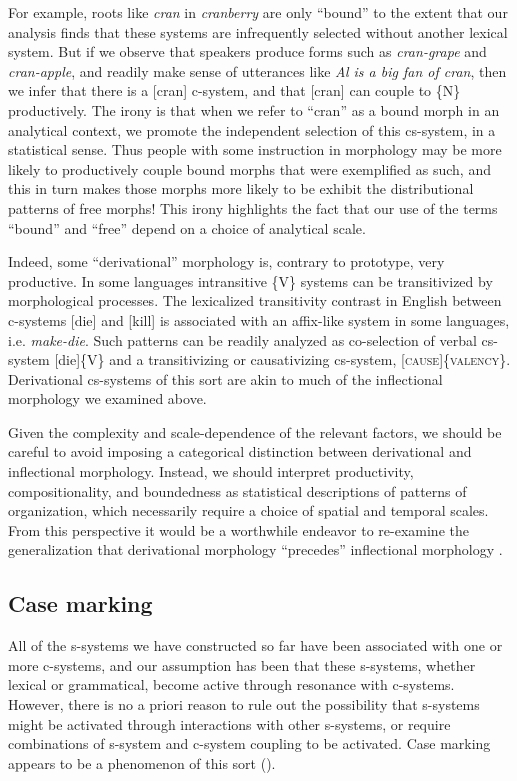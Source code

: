   For example, roots like \textit{cran} in \textit{cranberry} are only “bound” to the extent that our analysis finds that these systems are infrequently selected without another lexical system. But if we observe that speakers produce forms such as \textit{cran-grape} and \textit{cran-apple}, and readily make sense of utterances like \textit{Al is a big fan of cran}, then we infer that there is a [cran] c-system, and that [cran] can couple to \{N\} productively. The irony is that when we refer to “cran” as a bound morph in an analytical context, we promote the independent selection of this cs-system, in a statistical sense. Thus people with some instruction in morphology may be more likely to productively couple bound morphs that were exemplified as such, and this in turn makes those morphs more likely to be exhibit the distributional patterns of free morphs! This irony highlights the fact that our use of the terms “bound” and “free” depend on a choice of analytical scale.

  Indeed, some “derivational” morphology is, contrary to prototype, very productive. In some languages intransitive \{V\} systems can be transitivized by morphological processes. The lexicalized transitivity contrast in English between c-systems [die] and [kill] is associated with an affix-like system in some languages, i.e. \textit{make-die}. Such patterns can be readily analyzed as co-selection of verbal cs-system [die]\{V\} and a transitivizing or causativizing cs-system, [\textsc{cause}]\{\textsc{valency}\}. Derivational cs-systems of this sort are akin to much of the inflectional morphology we examined above. 

  Given the complexity and scale-dependence of the relevant factors, we should be careful to avoid imposing a categorical distinction between derivational and inflectional morphology. Instead, we should interpret productivity, compositionality, and boundedness as statistical descriptions of patterns of organization, which necessarily require a choice of spatial and temporal scales. From this perspective it would be a worthwhile endeavor to re-examine the generalization that derivational morphology “precedes” inflectional morphology \citep{Booij1996}.

\subsection{Case marking}

All of the s-systems we have constructed so far have been associated with one or more c-systems, and our assumption has been that these s-systems, whether lexical or grammatical, become active through resonance with c-systems. However, there is no a priori reason to rule out the possibility that s-systems might be activated through interactions with other s-systems, or require combinations of s-system and c-system coupling to be activated. Case marking appears to be a phenomenon of this sort (\citealt{BobaljikWurmbrand2008,MalchukovSpencer2008}).

